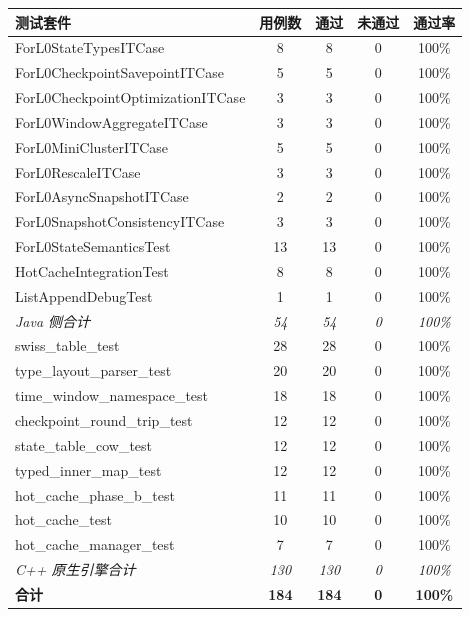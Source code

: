 \documentclass[a4paper,11pt]{article}
\begin{document}
\begin{table}[H]
\centering
\small
\begin{tabular}{@{}l cccc@{}}
\toprule
\textbf{测试套件} & \textbf{用例数} & \textbf{通过} & \textbf{未通过} & \textbf{通过率} \\
\midrule
ForL0StateTypesITCase                   & 8  & 8  & 0 & 100\% \\
ForL0CheckpointSavepointITCase          & 5  & 5  & 0 & 100\% \\
ForL0CheckpointOptimizationITCase       & 3  & 3  & 0 & 100\% \\
ForL0WindowAggregateITCase              & 3  & 3  & 0 & 100\% \\
ForL0MiniClusterITCase                  & 5  & 5  & 0 & 100\% \\
ForL0RescaleITCase                      & 3  & 3  & 0 & 100\% \\
ForL0AsyncSnapshotITCase                & 2  & 2  & 0 & 100\% \\
ForL0SnapshotConsistencyITCase          & 3  & 3  & 0 & 100\% \\
ForL0StateSemanticsTest                 & 13 & 13 & 0 & 100\% \\
HotCacheIntegrationTest                 & 8  & 8  & 0 & 100\% \\
ListAppendDebugTest                     & 1  & 1  & 0 & 100\% \\
\midrule
\textit{Java 侧合计}                    & \textit{54} & \textit{54} & \textit{0} & \textit{100\%} \\
\midrule
swiss\_table\_test                      & 28 & 28 & 0 & 100\% \\
type\_layout\_parser\_test              & 20 & 20 & 0 & 100\% \\
time\_window\_namespace\_test           & 18 & 18 & 0 & 100\% \\
checkpoint\_round\_trip\_test           & 12 & 12 & 0 & 100\% \\
state\_table\_cow\_test                 & 12 & 12 & 0 & 100\% \\
typed\_inner\_map\_test                 & 12 & 12 & 0 & 100\% \\
hot\_cache\_phase\_b\_test              & 11 & 11 & 0 & 100\% \\
hot\_cache\_test                        & 10 & 10 & 0 & 100\% \\
hot\_cache\_manager\_test               &  7 &  7 & 0 & 100\% \\
\midrule
\textit{C++ 原生引擎合计}                & \textit{130} & \textit{130} & \textit{0} & \textit{100\%} \\
\midrule
\textbf{合计}                            & \textbf{184} & \textbf{184} & \textbf{0} & \textbf{100\%} \\
\bottomrule
\end{tabular}
\end{table}
\end{document}
